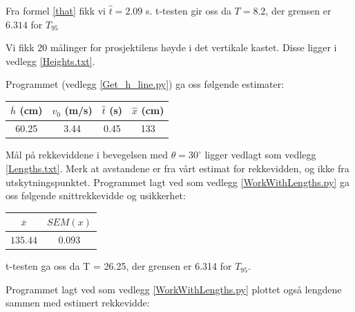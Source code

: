 Fra formel \ref{that} fikk vi $\hat{t} = 2.09$ s.  t-testen gir oss da $T = 8.2$, der grensen er $6.314$ for $T_{95}$ \medskip

Vi fikk 20 målinger for prosjektilens høyde i det vertikale kastet. Disse ligger i vedlegg \ref{Heights.txt}.

Programmet (vedlegg \ref{Get_h_line.py}) ga oss følgende estimater:

\begin{center}
\begin{tabular}{ | c | c | c | c | }
    \hline
    $\overline{h}$ (cm) & $v_0$ (m/s) & $\hat{t}$ (s) &  $\hat{x}$ (cm) \\ 
    \hline
    60.25 & 3.44 & 0.45 & 133 \\      
    \hline
\end{tabular}
\end{center}

Mål på rekkeviddene i bevegelsen med $\theta = 30^\circ$ ligger vedlagt som vedlegg \ref{Lengths.txt}. Merk at avstandene er fra vårt estimat for rekkevidden, og ikke fra utskytningspunktet. Programmet lagt ved som vedlegg \ref{WorkWithLengths.py} ga oss følgende snittrekkevidde og usikkerhet:

\begin{center}
\begin{tabular}{ | c | c |  }
    \hline
    $\overline{x}$ & $SEM(x)$\\ 
    \hline
    $135.44$ & 0.093\\     
    \hline
\end{tabular}
\end{center}

t-testen ga oss da T = 26.25, der grensen er 6.314 for $T_{95}$. \medskip

Programmet lagt ved som vedlegg \ref{WorkWithLengths.py} plottet også lengdene sammen med estimert rekkevidde:

